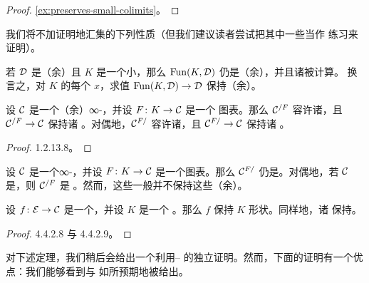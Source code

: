 \begin{proof}
\cref{ex:preserves-small-colimits}。
\end{proof}

我们将不加证明地汇集\trColimit{}的下列性质（但我们建议读者尝试把其中一些当作
练习来证明）。

\begin{proposition}\label{prop:fun-preserve-colimits}
若 $\mathcal{D}$ 是（余）\trComplete{}且 $K$ 是一个小\trSimplicialSet{}，那么
$\mathrm{Fun}(K, \mathcal{D})$ 仍是（余）\trComplete{}，并且诸\trColimit{}被\trPointwise{}计算。
换言之，对 $K$ 的每个\trObject{} $x$，求值\trFunctor{}%
$\mathrm{Fun}(K, \mathcal{D}) \to \mathcal{D}$ 保持（余）\trLimit{}。
\end{proposition}

\begin{proposition}\label{prop:fat-slice-preserve-colimits}
设 $\mathcal{C}$ 是一个（余）\trComplete{}∞-\trCategory{}，并设 $F\colon K \to \mathcal{C}$ 是一个
图表。那么 $\mathcal{C}^{/F}$ 容许诸\trColimit{}，且\trFunctor{} $\mathcal{C}^{/F} \to \mathcal{C}$ 保持诸%
\trColimit{}。对偶地，$\mathcal{C}^{F/}$ 容许诸\trLimit{}，且 $\mathcal{C}^{F/} \to \mathcal{C}$ 保持诸%
\trLimit{}。
\end{proposition}

\begin{proof}
\cite{Lur09} 1.2.13.8。
\end{proof}

\begin{proposition}\label{prop:fat-slice-cocomplete}
设 $\mathcal{C}$ 是一个\trCocomplete{}∞-\trCategory{}，并设 $F\colon K \to \mathcal{C}$ 是一个图表。那么
$\mathcal{C}^{F/}$ 仍是\trCocomplete{}。对偶地，若 $\mathcal{C}$ 是\trComplete{}，则 $\mathcal{C}^{/F}$ 是%
\trComplete{}。然而，这些\trForgetfulFunctor{}一般并不保持这些（余）\trLimit{}。
\end{proposition}

\begin{proposition}\label{prop:left-fibration-preserve-colimits}
设 $f\colon \mathcal{E} \to \mathcal{C}$ 是一个\trLeftFibration{}，并设 $K$ 是一个\trWeaklyContractible{}%
\trSimplicialSet{}。那么 $f$ 保持 $K$ 形状\trColimit{}。同样地，诸%
\trRightFibration{}保持\trContractible{}\trLimit{}。
\end{proposition}

\begin{proof}
\cite{Lur09} 4.4.2.8 与 4.4.2.9。
\end{proof}

对下述定理，我们稍后会给出一个利用\trStraightening{}--\trUnstraightening{}%
\trEquivalence{}的独立证明。然而，下面的证明有一个优点：我们能够看到\trLimit{}与%
\trColimit{}如所预期地被给出。

